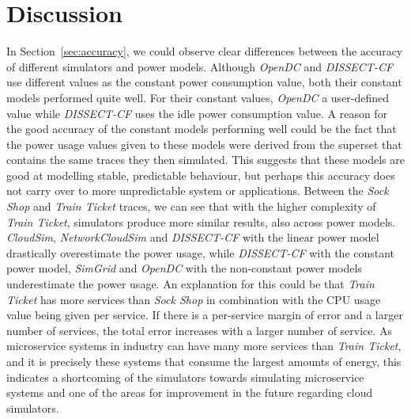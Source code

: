 \section{Discussion}\label{s:discussion}
In Section~\ref{sec:accuracy}, we could observe clear differences between the accuracy of different simulators and power models.
Although \textit{OpenDC} and \textit{DISSECT-CF} use different values as the constant power consumption value, both their constant models performed quite well. For their constant values, \textit{OpenDC} a user-defined value while \textit{DISSECT-CF} uses the idle power consumption value. A reason for the good accuracy of the constant models performing well could be the fact that the power usage values given to these models were derived from the superset that contains the same traces they then simulated. This suggests that these models are good at modelling stable, predictable behaviour, but perhaps this accuracy does not carry over to more unpredictable system or applications.
Between the \textit{Sock Shop} and \textit{Train Ticket} traces, we can see that with the higher complexity of \textit{Train Ticket}, simulators produce more similar results, also across power models. \textit{CloudSim}, \textit{NetworkCloudSim} and \textit{DISSECT-CF} with the linear power model drastically overestimate the power usage, while \textit{DISSECT-CF} with the constant power model, \textit{SimGrid} and \textit{OpenDC} with the non-constant power models underestimate the power usage. An explanation for this could be that \textit{Train Ticket} has more services than \textit{Sock Shop} in combination with the CPU usage value being given per service. If there is a per-service margin of error and a larger number of services, the total error increases with a larger number of service. As microservice systems in industry can have many more services than \textit{Train Ticket}, and it is precisely these systems that consume the largest amounts of energy, this indicates a shortcoming of the simulators towards simulating microservice systems and one of the areas for improvement in the future regarding cloud simulators.

